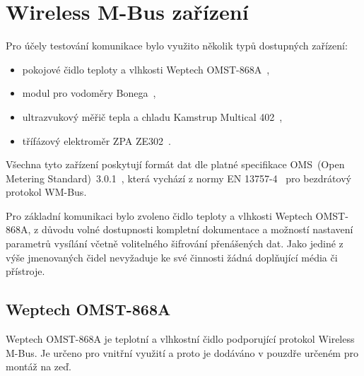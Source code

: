 \chapter{Wireless M-Bus zařízení}
\label{ChapterZarizeni}

Pro účely testování komunikace bylo využito několik typů dostupných zařízení:
\begin{itemize}
	\item pokojové čidlo teploty a vlhkosti Weptech OMST-868A~\cite{CidloWeptech},
	\item modul pro vodoměry Bonega~\cite{CidloBonega},
	\item ultrazvukový měřič tepla a chladu Kamstrup Multical 402~\cite{CidloKamstrup},
	\item třífázový elektroměr ZPA ZE302~\cite{CidloZpa}.
\end{itemize}

Všechna tyto zařízení poskytují formát dat dle platné specifikace OMS~(Open Metering Standard)~3.0.1~\cite{NormaOMS}, která vychází z normy EN 13757-4~\cite{Norma4} pro bezdrátový protokol WM-Bus.

Pro základní komunikaci bylo zvoleno čidlo teploty a vlhkosti Weptech OMST-868A, z důvodu volné dostupnosti kompletní dokumentace a možností nastavení parametrů vysílání včetně volitelného šifrování přenášených dat. Jako jediné z výše jmenovaných čidel nevyžaduje ke své činnosti žádná doplňující média či přístroje.
	
	
	
	\section{Weptech OMST-868A}
	
	Weptech OMST-868A je teplotní a vlhkostní čidlo podporující protokol Wireless M-Bus. Je určeno pro vnitřní využití a proto je dodáváno v pouzdře určeném pro montáž na zeď.
	
	

